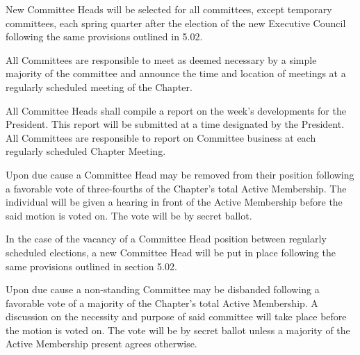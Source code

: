 \documentclass[11pt]{article}
\begin{document}
\begin{legal}
  \item
    New Committee Heads will be selected for all committees, except temporary committees, each spring quarter after the election of the new Executive Council following the same provisions outlined in 5.02.
  \item
    All Committees are responsible to meet as deemed necessary by a simple majority of the committee and announce the time and location of meetings at a regularly scheduled meeting of the Chapter.
  \item
    All Committee Heads shall compile a report on the week’s developments for the President.
    This report will be submitted at a time designated by the President.
    All Committees are responsible to report on Committee business at each regularly scheduled Chapter Meeting.
  \item
    Upon due cause a Committee Head may be removed from their position following a favorable vote of three-fourths of the Chapter’s total Active Membership.
    The individual will be given a hearing in front of the Active Membership before the said motion is voted on.
    The vote will be by secret ballot.
  \item
    In the case of the vacancy of a Committee Head position between regularly scheduled elections, a new Committee Head will be put in place following the same provisions outlined in section 5.02.
  \item
    Upon due cause a non-standing Committee may be disbanded following a favorable vote of a majority of the Chapter’s total Active Membership.
    A discussion on the necessity and purpose of said committee will take place before the motion is voted on.
    The vote will be by secret ballot unless a majority of the Active Membership present agrees otherwise.
\end{legal}
\end{document}
